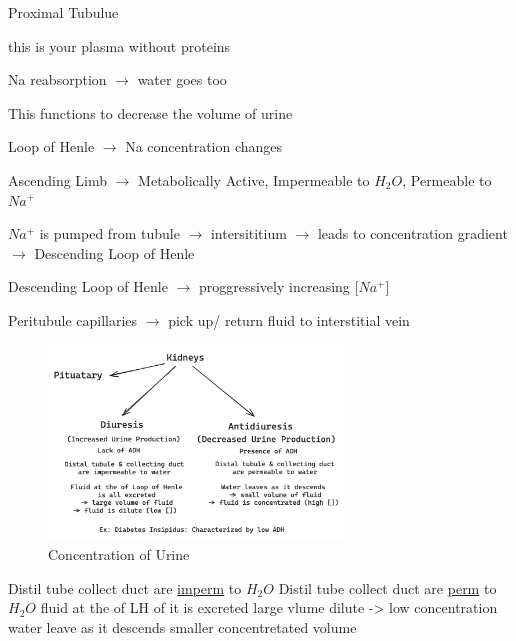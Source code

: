 \documentclass{report}
\begin{document}
  \item Proximal Tubulue
  \item this is your plasma without proteins
  \item Na reabsorption $\rightarrow$ water goes too
  \item This functions to decrease the volume of urine
  \item Loop of Henle $\rightarrow$ Na concentration changes
  \item Ascending Limb $\rightarrow$ Metabolically Active, Impermeable to $H_2O$, Permeable to $Na^+$  
  \item $Na^+$ is pumped from tubule $\rightarrow$ intersititium $\rightarrow$ leads to concentration gradient $\rightarrow$ Descending Loop of Henle
  \item Descending Loop of Henle $\rightarrow$ proggressively increasing [$Na^+$]
  \item Peritubule capillaries $\rightarrow$ pick up/ return fluid to interstitial vein
  \begin{figure}[htbp]
    \centering
    \includegraphics[width=0.7\textwidth]{img7.png}
    \caption{Concentration of Urine}
  \end{figure}
  Distil tube collect duct are \underline{imperm} to $H_2O$
  Distil tube collect duct are  \underline{perm} to $H_2O$ 
  fluid at the of LH of it is excreted large vlume dilute -> low concentration
  water leave as it descends smaller concentretated volume

\end{document}
